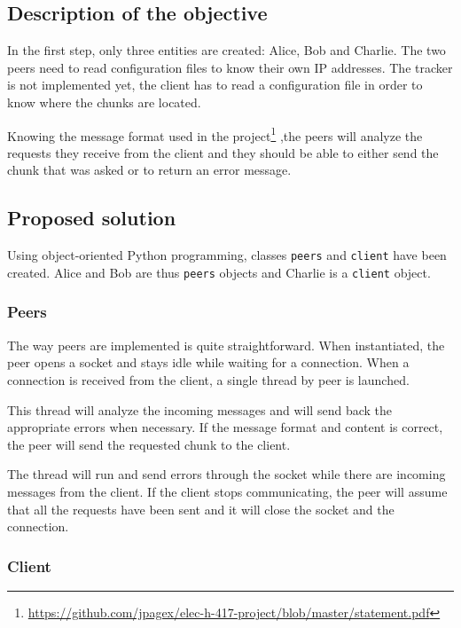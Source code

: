 \subsection{Description of the objective}

In the first step, only three entities are created: Alice, Bob and Charlie. The two peers need to read configuration files to know their own IP addresses. The tracker is not implemented yet, the client has to read a configuration file in order to know where the chunks are located.

Knowing the message format used in the project\footnote{\url{https://github.com/jpagex/elec-h-417-project/blob/master/statement.pdf}}
,the peers will analyze the requests they receive from the client and they should be able to either send the chunk that was asked or to return an error message.

\subsection{Proposed solution}

Using object-oriented Python programming, classes \texttt{peers} and \texttt{client} have been created. Alice and Bob are thus \texttt{peers} objects and Charlie is a \texttt{client} object.

\subsubsection{Peers}

The way peers are implemented is quite straightforward. When instantiated, the peer opens a socket and stays idle while waiting for a connection. When a connection is received from the client, a single thread by peer is launched.

This thread will analyze the incoming messages and will send back the appropriate errors when necessary. If the message format and content is correct, the peer will send the requested chunk to the client.

The thread will run and send errors through the socket while there are incoming messages from the client. If the client stops communicating, the peer will assume that all the requests have been sent and it will close the socket and the connection.

\subsubsection{Client}

